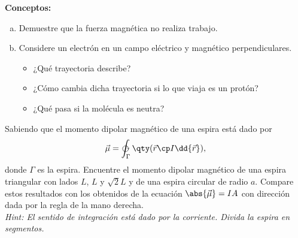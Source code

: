 \begin{mdframed}[style=warning]
	\begin{ejercicio}
		\textbf{Conceptos: }
		\begin{enumerate}[a)]
			\item Demuestre que la fuerza magnética no realiza trabajo.
			\item Considere un electrón en un campo eléctrico y magnético perpendiculares.
			\begin{itemize}
				\item ¿Qué trayectoria describe?
				\item ¿Cómo cambia dicha trayectoria si lo que viaja es un protón?
				\item ¿Qué pasa si la molécula es neutra?
			\end{itemize}
		\end{enumerate}
	\end{ejercicio}
\end{mdframed}











\begin{mdframed}[style=warning]
	\begin{ejercicio}
		Sabiendo que el momento dipolar magnético de una espira está dado por
		$$ \vec{\mu} = \varointclockwise _{\Gamma} \qty(\vec{r} \cp I\dd{\vec{r}}), $$
		donde $\Gamma$ es la espira. Encuentre el momento dipolar magnético de una espira triangular con lados $L$, $L$ y $\sqrt{2} L$ y de una espira circular de radio $a$. Compare estos resultados con los obtenidos de la ecuación $\abs{\vec{\mu}} = IA$ con dirección dada por la regla de la mano derecha. \\
		\textit{Hint: El sentido de integración está dado por la corriente. Divida la espira en segmentos.}
	\end{ejercicio}
\end{mdframed}



















